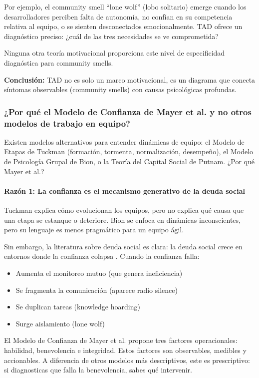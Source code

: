 Por ejemplo, el community smell ``lone wolf'' (lobo solitario) emerge cuando los desarrolladores perciben falta de autonomía, no confían en su competencia relativa al equipo, o se sienten desconectados emocionalmente. TAD ofrece un diagnóstico preciso: ¿cuál de las tres necesidades se ve comprometida?

Ninguna otra teoría motivacional proporciona este nivel de especificidad diagnóstica para community smells.

\textbf{Conclusión:} TAD no es solo un marco motivacional, es un diagrama que conecta síntomas observables (community smells) con causas psicológicas profundas.

\subsubsection{¿Por qué el Modelo de Confianza de Mayer et al. y no otros modelos de trabajo en equipo?}

Existen modelos alternativos para entender dinámicas de equipo: el Modelo de Etapas de Tuckman (formación, tormenta, normalización, desempeño), el Modelo de Psicología Grupal de Bion, o la Teoría del Capital Social de Putnam. ¿Por qué Mayer et al.?

\paragraph{Razón 1: La confianza es el mecanismo generativo de la deuda social}

Tuckman explica cómo evolucionan los equipos, pero no explica qué causa que una etapa se estanque o deteriore. Bion se enfoca en dinámicas inconscientes, pero su lenguaje es menos pragmático para un equipo ágil.

Sin embargo, la literatura sobre deuda social es clara: la deuda social crece en entornos donde la confianza colapsa \cite{wilson_all_2006, mayer_integrative_1995}. Cuando la confianza falla:
\begin{itemize}
\item Aumenta el monitoreo mutuo (que genera ineficiencia)
\item Se fragmenta la comunicación (aparece radio silence)
\item Se duplican tareas (knowledge hoarding)
\item Surge aislamiento (lone wolf)
\end{itemize}

El Modelo de Confianza de Mayer et al. propone tres factores operacionales: habilidad, benevolencia e integridad. Estos factores son observables, medibles y accionables. A diferencia de otros modelos más descriptivos, este es prescriptivo: si diagnosticas que falla la benevolencia, sabes qué intervenir.

